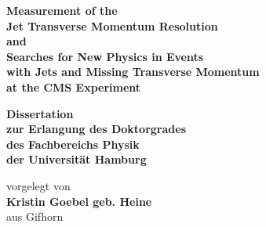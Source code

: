 \documentclass[
twoside=true,
BCOR10mm,
headsepline,     %
headings=normal,
open=right,
numbers=noenddot, %
a4paper
]{scrreprt} %
\author{Kristin Goebel}
\begin{document}
\begin{titlepage}
  \begin{center}
    \thispagestyle{empty}
    \vspace*{1cm}
    \begin{doublespace} 
      \textbf{\LARGE Measurement of the}\\
      \textbf{\LARGE Jet Transverse Momentum Resolution}\\
      \textbf{\LARGE and }\\
      \textbf{\LARGE Searches for New Physics in Events}\\
      \textbf{\LARGE with Jets and Missing Transverse Momentum}\\
      \textbf{\LARGE at the CMS Experiment} \\
      \vskip1.5cm
      \begin{Large} 
        \textbf{Dissertation\\
          zur Erlangung des Doktorgrades\\
          des Fachbereichs Physik\\
          der Universit\"{a}t Hamburg\\}
      \end{Large}
      \vskip2cm
      \begin{large}
        vorgelegt von\\
        {\bf Kristin Goebel geb. Heine}\\
        aus Gifhorn
        \vfill
      \end{large}
    \end{doublespace} 
  \end{center}
\end{titlepage}


\newpage 
\thispagestyle{empty}
\quad 
\newpage
\thispagestyle{empty}
\end{document}
